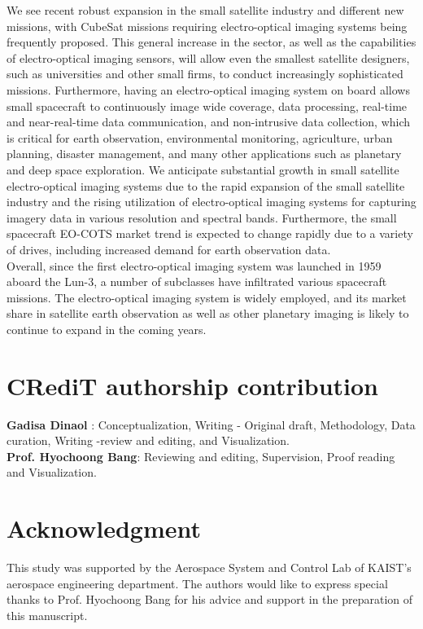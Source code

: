 \documentclass[final,5p,times,sort&compress,twocolumn]{elsarticle}
\begin{document}
We see recent robust expansion in the small satellite industry and different new missions, with CubeSat missions requiring electro-optical imaging systems being frequently proposed. This general increase in the sector, as well as the capabilities of electro-optical imaging sensors, will allow even the smallest satellite designers, such as universities and other small firms, to conduct increasingly sophisticated missions. Furthermore, having an electro-optical imaging system on board allows small spacecraft to continuously image wide coverage, data processing, real-time and near-real-time data communication, and non-intrusive data collection, which is critical for earth observation, environmental monitoring, agriculture, urban planning, disaster management, and many other applications such as planetary and deep space exploration.  We anticipate substantial growth in small satellite electro-optical imaging systems due to the rapid expansion of the small satellite industry and the rising utilization of electro-optical imaging systems for capturing imagery data in various resolution and spectral bands. Furthermore, the small spacecraft EO-COTS market trend is expected to change rapidly due to a variety of drives, including increased demand for earth observation data.\\
Overall, since the first electro-optical imaging system was launched in 1959 aboard the Lun-3, a number of subclasses have infiltrated various spacecraft missions. The electro-optical imaging system is widely employed, and its market share in satellite earth observation as well as other planetary imaging is likely to continue to expand in the coming years.
\section*{CRediT authorship contribution }
\textbf{Gadisa Dinaol }: Conceptualization,  Writing - Original draft, Methodology, Data curation, Writing -review and editing, and Visualization.\\
\textbf{Prof. Hyochoong Bang}: Reviewing and editing,  Supervision, Proof reading and Visualization.
\section*{Acknowledgment}
This study was supported by the Aerospace System and Control Lab of KAIST's aerospace engineering department. The authors would like to express special thanks to Prof. Hyochoong Bang for his advice and support in the preparation of this manuscript.
\end{document}
